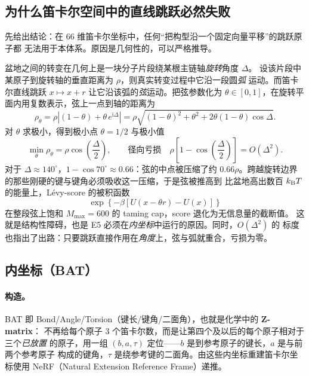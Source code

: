 \documentclass[11pt,a4paper]{article}
\begin{document}
\subsection{为什么笛卡尔空间中的直线跳跃必然失败}

先给出结论：在 66 维笛卡尔坐标中，任何“把构型沿一个固定向量平移”的跳跃原子都
无法用于本体系。原因是几何性的，可以严格推导。

盆地之间的转变在几何上是一块分子片段绕某根主链轴\emph{旋转}角度 $\Delta$。
设该片段中某原子到旋转轴的垂直距离为 $\rho$，则真实转变过程中它沿一段圆\emph{弧}
运动。而笛卡尔直线跳跃 $x\mapsto x+r$ 让它沿该弧的\emph{弦}运动。把弦参数化为
$\theta\in[0,1]$，在旋转平面内用复数表示，弦上一点到轴的距离为
\begin{equation}
 \rho_\theta=\rho\left|(1-\theta)+\theta\,e^{\mathrm{i}\Delta}\right|
 =\rho\sqrt{(1-\theta)^2+\theta^2+2\theta(1-\theta)\cos\Delta}.
\end{equation}
对 $\theta$ 求极小，得到极小点 $\theta=1/2$ 与极小值
\begin{equation}
 \min_\theta\rho_\theta=\rho\cos\!\left(\frac{\Delta}{2}\right),
 \qquad\text{径向亏损}\quad
 \rho\left[1-\cos\!\left(\frac{\Delta}{2}\right)\right]=O(\Delta^2).
\end{equation}
对于 $\Delta\approx140^\circ$，$1-\cos70^\circ\approx0.66$：弦的中点被压缩了约
$0.66\rho$。跨越旋转边界的那些刚硬的键与键角必须吸收这一压缩，于是弦被推高到
比盆地高出数百 $k_{\rm B}T$ 的能量上，Lévy-score 的被积函数
\begin{equation}
 \exp\!\left\{-\beta\left[U(x-\theta r)-U(x)\right]\right\}
\end{equation}
在整段弦上饱和 $M_{\max}=600$ 的 taming cap，score 退化为无信息量的截断值。
这就是结构性障碍，也是 E5 必须在\emph{内坐标}中运行的原因。同时，$O(\Delta^2)$ 的
标度也指出了出路：只要跳跃直接作用在\emph{角度}上，弦与弧就重合，亏损为零。

\subsection{内坐标（BAT）}

\paragraph{构造。}
BAT 即 Bond/Angle/Torsion（键长/键角/二面角），也就是化学中的 \textbf{Z-matrix}：
不再给每个原子 3 个笛卡尔数，而是让第四个及以后的每个原子相对于三个\emph{已放置}
的原子，用一组 $(b,a,\tau)$ 定位——$b$ 是到参考原子的键长，$a$ 是与前两个参考原子
构成的键角，$\tau$ 是绕参考键的二面角。由这些内坐标重建笛卡尔坐标使用
NeRF（Natural Extension Reference Frame）递推。
\end{document}
